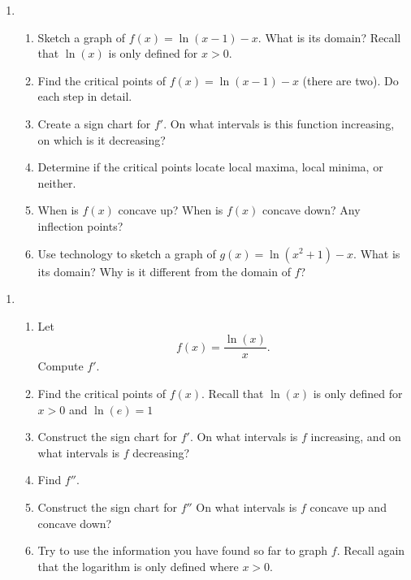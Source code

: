 \documentclass[10pt]{article}
\begin{document}
\begin{enumerate}
\item[Board 2.] \, 
\begin{enumerate}
    \item Sketch a graph of $f(x)= \ln(x-1)-x$. What is its domain? Recall that $\ln(x)$ is only defined for $x > 0$. 
    \item Find the critical points of $f(x)= \ln(x-1)-x$ (there are two). Do each step in detail. 
    \item Create a sign chart for $f'$. On what intervals is this function increasing, on which is it decreasing? 
    \item Determine if the critical points locate local maxima, local minima, or neither.
    \item When is $f(x)$ concave up? When is $f(x)$ concave down? Any inflection points?
    \item Use technology to sketch a graph of $g(x)=\ln(x^2+1)-x $. What is its domain? Why is it different from the domain of $f$?
    \end{enumerate}
    \end{enumerate}
    \newpage
    
    
    \begin{enumerate}
    \item[Board 3.] \, 
\begin{enumerate}
    \item Let 
    \[
    f(x)=\frac{\ln(x)}{x}.
    \]  Compute $f'$. 
    \item Find the critical points of $f(x)$. Recall that $\ln(x)$ is only defined for $x > 0$ and $\ln(e)=1$
    \item Construct the sign chart for $f'$. On what intervals is $f$ increasing, and on what intervals is $f$ decreasing? 
    \item Find $f''$. 
    \item Construct the sign chart for $f''$ On what intervals is $f$ concave up and concave down?
    \item Try to use the information you have found so far to graph $f$. Recall again that the logarithm is only defined where $x>0$.
\end{enumerate}
\end{enumerate}
\newpage
\end{document}
